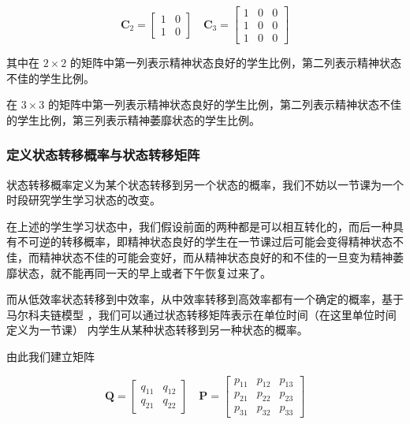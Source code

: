 \documentclass[a4paper]{article}
\let\mat\boldsymbol %
\begin{document}
   \begin{equation}
   \mat{C}_2=
   \begin{bmatrix}
   1 & 0 \\
   1 & 0
   \end{bmatrix}\quad
   \mat{C}_3=
   \begin{bmatrix}
   1 & 0 & 0 \\
   1 & 0 & 0 \\
   1 & 0 & 0
   \end{bmatrix}
   \end{equation}

   其中在 $2\times2$ 的矩阵中第一列表示精神状态良好的学生比例，第二列表示精神状态不佳的学生比例。

   在 $3\times3$ 的矩阵中第一列表示精神状态良好的学生比例，第二列表示精神状态不佳的学生比例，第三列表示精神萎靡状态的学生比例。

  \subsubsection{定义状态转移概率与状态转移矩阵}

   状态转移概率定义为某个状态转移到另一个状态的概率，我们不妨以一节课为一个时段研究学生学习状态的改变。

   在上述的学生学习状态中，我们假设前面的两种都是可以相互转化的，而后一种具有不可逆的转移概率，即精神状态良好的学生在一节课过后可能会变得精神状态不佳，而精神状态不佳的可能会变好，而从精神状态良好的和不佳的一旦变为精神萎靡状态，就不能再同一天的早上或者下午恢复过来了。

   而从低效率状态转移到中效率，从中效率转移到高效率都有一个确定的概率，基于马尔科夫链模型 \cite{ISBN9787040311501-1}，我们可以通过状态转移矩阵表示在单位时间（在这里单位时间定义为一节课） 内学生从某种状态转移到另一种状态的概率。

   由此我们建立矩阵

   \begin{equation}
   \mat{Q}=
   \begin{bmatrix}
   q_{11} & q_{12} \\
   q_{21} & q_{22}
   \end{bmatrix}\quad
   \mat{P}=
   \begin{bmatrix}
   p_{11} & p_{12} & p_{13} \\
   p_{21} & p_{22} & p_{23} \\
   p_{31} & p_{32} & p_{33}
   \end{bmatrix}
   \end{equation}
\end{document}
